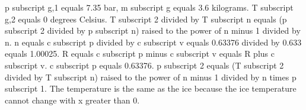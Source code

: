 p subscript g,1 equals 7.35 bar, m subscript g equals 3.6 kilograms.  
T subscript g,2 equals 0 degrees Celsius.  
T subscript 2 divided by T subscript n equals (p subscript 2 divided by p subscript n) raised to the power of n minus 1 divided by n.  
n equals c subscript p divided by c subscript v equals 0.63376 divided by 0.633 equals 1.00025.  
R equals c subscript p minus c subscript v equals R plus c subscript v.  
c subscript p equals 0.63376.  
p subscript 2 equals (T subscript 2 divided by T subscript n) raised to the power of n minus 1 divided by n times p subscript 1.  
The temperature is the same as the ice because the ice temperature cannot change with x greater than 0.